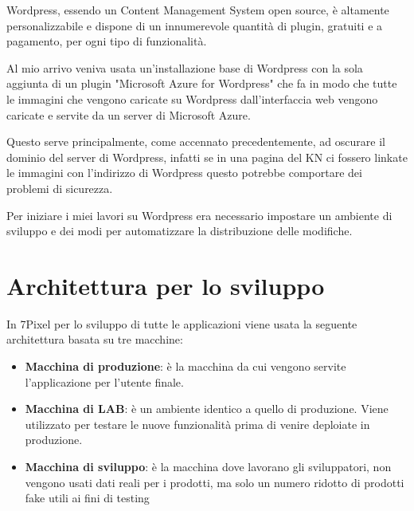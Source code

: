 


Wordpress, essendo un Content Management System open source, è altamente personalizzabile e dispone
di un innumerevole quantità di plugin, gratuiti e a pagamento, per ogni tipo di funzionalità.

Al mio arrivo veniva usata un'installazione base di Wordpress con la sola aggiunta di un plugin "Microsoft Azure 
for Wordpress" che fa in modo che tutte le immagini che vengono caricate su Wordpress dall'interfaccia web
vengono caricate e servite da un server di Microsoft Azure.

Questo serve principalmente, come accennato precedentemente, ad oscurare il dominio del server di Wordpress,
infatti se in una pagina del KN ci fossero linkate le immagini con l'indirizzo di Wordpress questo potrebbe 
comportare dei problemi di sicurezza.

Per iniziare i miei lavori su Wordpress era necessario impostare un ambiente di sviluppo e dei modi per automatizzare
la distribuzione delle modifiche.

\section{Architettura per lo sviluppo}

In 7Pixel per lo sviluppo di tutte le applicazioni viene usata la seguente architettura basata su tre macchine:
\begin{itemize}
\item {\bf Macchina di produzione}: è la macchina da cui vengono servite l'applicazione per l'utente finale.
\item {\bf Macchina di LAB}: è un ambiente identico a quello di produzione. Viene utilizzato per testare le nuove funzionalità
prima di venire deploiate in produzione.
\item {\bf Macchina di sviluppo}: è la macchina dove lavorano gli sviluppatori, non vengono usati dati reali per i prodotti, 
ma solo un numero ridotto di prodotti fake utili ai fini di testing
\end{itemize}

